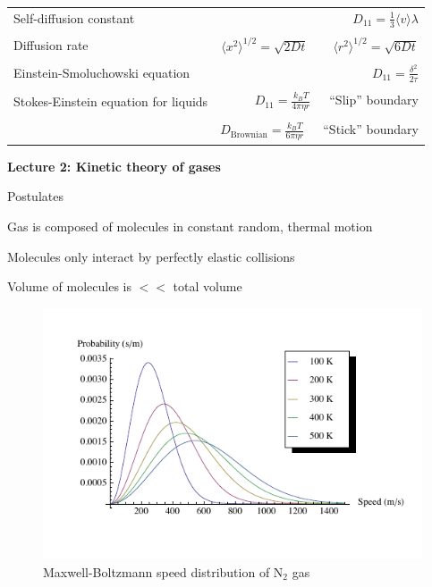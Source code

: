 \documentclass[11pt]{article}
\begin{document}
\begin{outline}
\begin{table}
\begin{center}
\begin{tabular}{|lr|}
Self-diffusion constant &
$\displaystyle D_{11} = \frac{1}{3}\langle v \rangle \lambda $ \\ & \\

Diffusion rate &
$\displaystyle \langle x^2 \rangle^{1/2} = \sqrt{2 D t} $\ \ \ \  $\langle r^2 \rangle^{1/2} = \sqrt{6
D t}$ \\ & \\

Einstein-Smoluchowski equation & $\displaystyle D_{11}= \frac{\delta^2}{2\tau}$ \\ & \\

Stokes-Einstein equation for liquids & $\displaystyle D_{11}=\frac{k_BT}{4\pi\eta r}$\ \ \
``Slip'' boundary \\
 & \\
 & $\displaystyle D_\mathrm{Brownian}=\frac{k_BT}{6\pi\eta r}$\ \ \ ``Stick'' boundary \\
\hline
    \end{tabular}
\end{center}
 \end{table}

\item{{\bf Lecture 2: Kinetic theory of gases}}
  \begin{outline}
  \item{Postulates}
    \begin{outline}
    \item Gas is composed of molecules in constant random, thermal motion
    \item Molecules only interact by perfectly elastic collisions
    \item Volume of molecules is $<<$ total volume
    \end{outline}

\begin{figure}
\begin{center}
\includegraphics[scale=1.25]{Images/MaxwellBoltzmann.pdf}
\caption{Maxwell-Boltzmann speed distribution of N$_2$ gas}
\end{center}
\end{figure}


\end{outline}
\end{outline}
\end{document}
